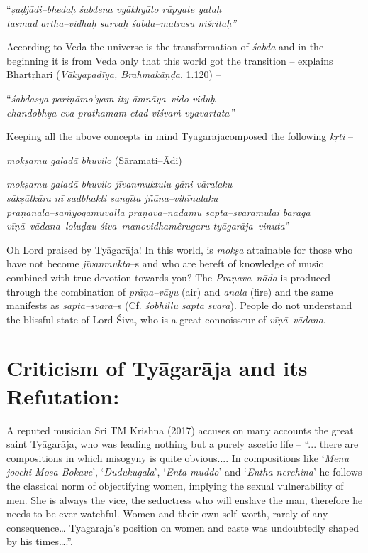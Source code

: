 \begin{myquote}
“\textit{ṣaḍjādi–bhedaḥ śabdena vyākhyāto rūpyate yataḥ }\\\textit{tasmād artha–vidhāḥ sarvāḥ śabda–mātrāsu niśritāḥ”} 
\end{myquote}

According to Veda the universe is the transformation of \textit{śabda} and in the beginning it is from Veda only that this world got the transition – explains Bhartṛhari (\textit{Vākyapadīya, Brahmakāṇḍa}, 1.120) –

\begin{myquote}
“\textit{śabdasya pariṇāmo’yam ity āmnāya–vido viduḥ }\\\textit{chandobhya eva prathamam etad viśvaṁ vyavartata”} 
\end{myquote}

Keeping all the above concepts in mind Tyāgarājacomposed the following \textit{kṛti} –

\textit{mokṣamu galadā bhuvilo} (Sāramati–Ādi)

\begin{myquote}
\textit{mokṣamu galadā bhuvilo jīvanmuktulu gāni vāralaku}\\\textit{sākṣātkāra nī sadbhakti sangīta jñāna–vihīnulaku}\\\textit{prāṇānala–saṁyogamuvalla praṇava–nādamu sapta–svaramulai baraga}\\\textit{vīṇā–vādana–loluḍau śiva–manovidhamêrugaru tyāgarāja–vinuta}”
\end{myquote}

Oh Lord praised by Tyāgarāja! In this world, is \textit{mokṣa} attainable for those who have not become \textit{jīvanmukta}–s and who are bereft of knowledge of music combined with true devotion towards you? The \textit{Praṇava–nāda} is produced through the combination of \textit{prāṇa–vāyu} (air) and \textit{anala} (fire) and the same manifests as \textit{sapta–svara}–s (Cf. \textit{śobhillu sapta svara}). People do not understand the blissful state of Lord Śiva, who is a great connoisseur of \textit{vīṇā–vādana}.


\section*{Criticism of Tyāgarāja and its Refutation:}

A reputed musician Sri TM Krishna (2017) accuses on many accounts the great saint Tyāgarāja, who was leading nothing but a purely ascetic life – “... there are compositions in which misogyny is quite obvious.... In compositions like ‘\textit{Menu joochi Mosa Bokave}’, ‘\textit{Dudukugala}’, ‘\textit{Enta muddo}’ and ‘\textit{Entha nerchina}’ he follows the classical norm of objectifying women, implying the sexual vulnerability of men. She is always the vice, the seductress who will enslave the man, therefore he needs to be ever watchful. Women and their own self–worth, rarely of any consequence… Tyagaraja’s position on women and caste was undoubtedly shaped by his times….”.

